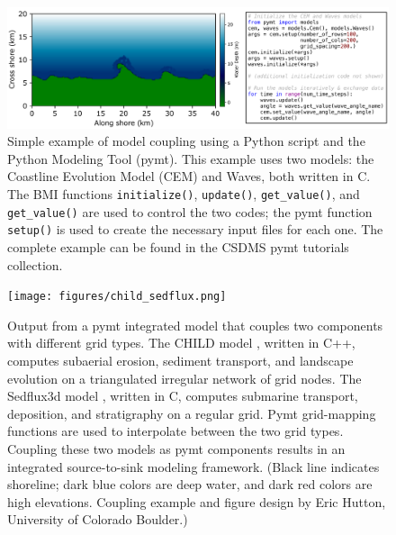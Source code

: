 \documentclass[10pt,twocolumn,preprint]{elsarticle}
\begin{document}
\begin{figure}[htbp]
   \centering
   \includegraphics[width=\textwidth]{figures/pymt_cem+waves_example.pdf} %
   \caption{Simple example of model coupling using a Python script and the Python Modeling Tool (pymt). This example uses two models: the Coastline Evolution Model (CEM) and Waves, both written in C. The BMI functions \texttt{initialize()}, \texttt{update()}, \texttt{get\_value()}, and \texttt{get\_value()} are used to control the two codes; the pymt function \texttt{setup()} is used to create the necessary input files for each one. The complete example can be found in the CSDMS pymt tutorials collection.}
   \label{fig:pymt-cem-waves-example}
\end{figure}

\begin{figure}[htbp]
   \centering
   \texttt{[image: figures/child\_sedflux.png]} 
   \caption{Output from a pymt integrated model that couples two components with different grid types. The CHILD model \citep{tucker2001channel}, written in C++, computes subaerial erosion, sediment transport, and landscape evolution on a triangulated irregular network of grid nodes. The Sedflux3d model \citep{hutton2008sedflux}, written in C, computes submarine transport, deposition, and stratigraphy on a regular grid. Pymt grid-mapping functions are used to interpolate between the two grid types. Coupling these two models as pymt components results in an integrated source-to-sink modeling framework. (Black line indicates shoreline; dark blue colors are deep water, and dark red colors are high elevations. Coupling example and figure design by Eric Hutton, University of Colorado Boulder.)}
   \label{fig:child-sedflux}
\end{figure}
\end{document}
